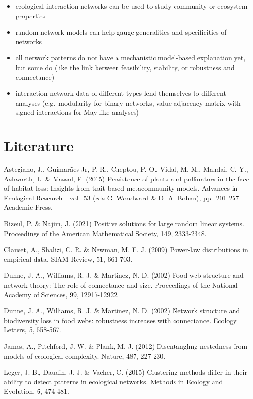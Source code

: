 \documentclass[
]{book}
\providecommand{\tightlist}{%
  \setlength{\itemsep}{0pt}\setlength{\parskip}{0pt}}
\theoremstyle{definition}
\theoremstyle{definition}
\theoremstyle{definition}
\theoremstyle{definition}
\theoremstyle{remark}
\begin{document}
\begin{itemize}
\tightlist
\item
  ecological interaction networks can be used to study community or ecosystem properties
\item
  random network models can help gauge generalities and specificities of networks
\item
  all network patterns do not have a mechanistic model-based explanation yet, but some do (like the link between feasibility, stability, or robustness and connectance)
\item
  interaction network data of different types lend themselves to different analyses (e.g.~modularity for binary networks, value adjacency matrix with signed interactions for May-like analyses)
\end{itemize}

\section{Literature}\label{literature}

Astegiano, J., Guimarães Jr, P. R., Cheptou, P.-O., Vidal, M. M., Mandai, C. Y., Ashworth, L. \& Massol, F. (2015) Persistence of plants and pollinators in the face of habitat loss: Insights from trait-based metacommunity models. Advances in Ecological Research - vol.~53 (eds G. Woodward \& D. A. Bohan), pp.~201-257. Academic Press.

Bizeul, P. \& Najim, J. (2021) Positive solutions for large random linear systems. Proceedings of the American Mathematical Society, 149, 2333-2348.

Clauset, A., Shalizi, C. R. \& Newman, M. E. J. (2009) Power-law distributions in empirical data. SIAM Review, 51, 661-703.

Dunne, J. A., Williams, R. J. \& Martinez, N. D. (2002) Food-web structure and network theory: The role of connectance and size. Proceedings of the National Academy of Sciences, 99, 12917-12922.

Dunne, J. A., Williams, R. J. \& Martinez, N. D. (2002) Network structure and biodiversity loss in food webs: robustness increases with connectance. Ecology Letters, 5, 558-567.

James, A., Pitchford, J. W. \& Plank, M. J. (2012) Disentangling nestedness from models of ecological complexity. Nature, 487, 227-230.

Leger, J.-B., Daudin, J.-J. \& Vacher, C. (2015) Clustering methods differ in their ability to detect patterns in ecological networks. Methods in Ecology and Evolution, 6, 474-481.
\end{document}
